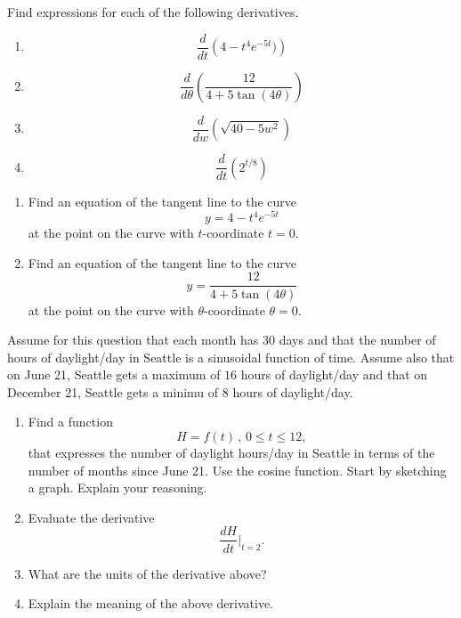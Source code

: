 \documentclass{ximera}
\begin{document}
\begin{question}  \label{Qujn5tyh6uu}
Find expressions for each of the following derivatives.

\begin{enumerate}
\item 
\[
\frac{d}{dt}\left( 4 - t^4 e^{-5t})  \right)
\]

\item 
\[
\frac{d}{d\theta}\left(  \frac{12}{4 + 5\tan (4\theta)}   \right)
\]

\item
\[
   \frac{d}{dw}\left(   \sqrt{40-5w^2}   \right)
\]

\item
\[
   \frac{d}{dt}\left(   2^{t/8}   \right)
\]

\end{enumerate}

\end{question}

\begin{question} \label{Evchfhdhfhd}
\begin{enumerate}

\item Find an equation of the tangent line to the curve 
\[
  y =  4 - t^4 e^{-5t}
\]
at the point on the curve with $t$-coordinate $t=0$.

\item Find an equation of the tangent line to the curve 
\[
  y =   \frac{12}{4 + 5\tan (4\theta)}
\]
at the point on the curve with $\theta$-coordinate $\theta=0$.
\end{enumerate}
\end{question}

\begin{question} \label{Q000d9ggdgbgh}
Assume for this question that each month has 30 days and that the number of hours of daylight/day in Seattle is a sinusoidal function of time. Assume also that on June 21, Seattle gets a maximum of $16$ hours of daylight/day and that on December 21, Seattle gets a minimu of $8$ hours of daylight/day.

\begin{enumerate}
\item Find a function 
\[
   H = f(t) \, , \, 0\leq t\leq 12,
\]
that expresses the number of daylight hours/day in Seattle in terms of the number of months since June 21. Use the cosine function. Start by sketching a graph. Explain your reasoning.

\item Evaluate the derivative 
\[
   \frac{dH}{dt}\Big|_{t=2} .
\]

\item What are the units of the derivative above?

\item Explain the meaning of the above derivative.
\end{enumerate}

\end{question}
\end{document}
